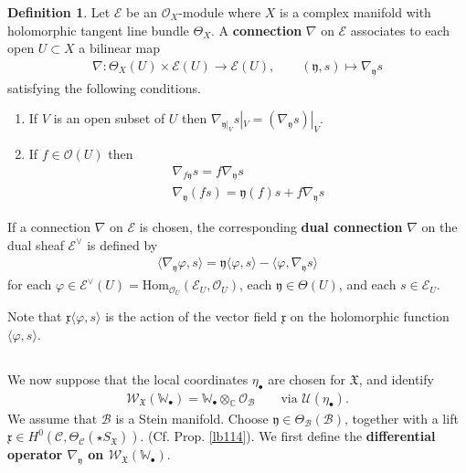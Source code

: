 \documentclass[12pt,a4paper,notitlepage]{article}
\theoremstyle{definition}
\newtheorem{df}{Definition}[section]
\theoremstyle{plain}
\newcommand{\fk}{\mathfrak}
\newcommand{\mc}{\mathcal}
\newcommand{\Hom}{\mathrm{Hom}}
\newcommand{\bk}[1]{\langle {#1}\rangle}
\newcommand{\scr}{\mathscr}
\newcommand{\xk}{\mathfrak x}
\newcommand{\yk}{\mathfrak y}
\newcommand{\SX}{{S_{\fk X}}}
\newcommand{\blt}{\bullet}
\newcommand{\Wbb}{\mathbb W}
\newcommand{\Cbb}{\mathbb C}
\numberwithin{equation}{section}
\begin{document}
\begin{df}
Let $\scr E$ be an $\scr O_X$-module where $X$ is a complex manifold with holomorphic tangent line bundle $\Theta_X$. A \textbf{connection} $\nabla$ on $\scr E$ associates to each open $U\subset X$ a bilinear map
\begin{align*}
\nabla:\Theta_X(U)\times\scr E(U)\rightarrow\scr E(U),\qquad (\yk,s)\mapsto\nabla_\yk s
\end{align*}
satisfying the following conditions.
\begin{enumerate}[label=(\alph*)]
\item If $V$ is an open subset of $U$ then $\nabla_{\yk|_V}s|_V=(\nabla_{\yk}s)|_V$.
\item If $f\in\scr O(U)$ then
\begin{subequations}
\begin{gather*}
\nabla_{f\yk}s=f\nabla_{\yk}s\\
\nabla_\yk(fs)=\yk(f)s+f\nabla_\yk s
\end{gather*}
\end{subequations}
\end{enumerate}
If a connection $\nabla$ on $\scr E$ is chosen, the corresponding \textbf{dual connection} $\nabla$ on the dual sheaf $\scr E^\vee$ is defined by
\begin{align}
\bk{\nabla_\yk\varphi,s}=\yk\bk{\varphi,s}-\bk{\varphi,\nabla_\yk s}\label{eq230}
\end{align}
for each $\varphi\in \scr E^\vee(U)=\Hom_{\scr O_U}(\scr E_U,\scr O_U)$, each $\yk\in\Theta(U)$, and each $s\in\scr E_U$.
\end{df}

Note that $\xk\bk{\varphi,s}$ is the action of the vector field $\xk$ on the holomorphic function $\bk{\varphi,s}$.


\subsection{}


We now suppose that the local coordinates $\eta_\blt$ are chosen for $\fk X$, and identify
\begin{align*}
\scr W_{\fk X}(\Wbb_\blt)=\Wbb_\blt\otimes_\Cbb\scr O_{\mc B}\qquad\text{via }\mc U(\eta_\blt).
\end{align*}
We assume that $\mc B$ is a Stein manifold. Choose $\yk\in\Theta_{\mc B}(\mc B)$, together with a lift $\xk\in H^0(\mc C,\Theta_{\mc C}(\star\SX))$. (Cf. Prop. \ref{lb114}).   We first define the \textbf{differential operator $\nabla_\yk$ on $\scr W_{\fk X}(\Wbb_\blt)$}. 
\end{document}
